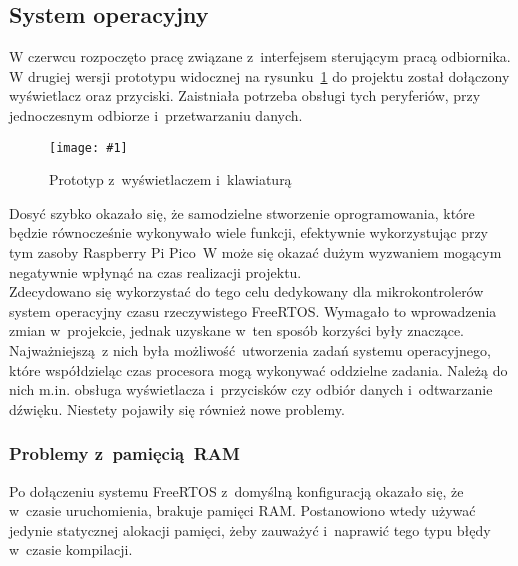 \documentclass[polish]{aghengthesis}
\newcommand{\imgint}[4]{
	\begin{figure}[{#4}]
		\centering
		\texttt{[image: \#1]}
		\caption{#2}
		\label{#1}
	\end{figure}
}
\newcommand{\imgh}[3]{\imgint{#1}{#2}{#3}{H}}
\begin{document}
			
		\subsection{System operacyjny}
			W czerwcu rozpoczęto pracę związane z~interfejsem sterującym pracą odbiornika.
			W drugiej wersji prototypu widocznej na rysunku~\ref{4/prototype_2} do projektu został dołączony wyświetlacz oraz przyciski. Zaistniała potrzeba obsługi tych peryferiów, przy jednoczesnym odbiorze i~przetwarzaniu danych.
			
			\imgh{4/prototype_2}{Prototyp z~wyświetlaczem i~klawiaturą}{0.8}
			
			Dosyć szybko okazało się, że samodzielne stworzenie oprogramowania, które będzie równocześnie wykonywało wiele funkcji, efektywnie wykorzystując przy tym zasoby Raspberry Pi Pico~W może się okazać dużym wyzwaniem mogącym negatywnie wpłynąć na czas realizacji projektu.
			$ $\\
			
			Zdecydowano się wykorzystać do tego celu dedykowany dla mikrokontrolerów system operacyjny czasu rzeczywistego FreeRTOS. Wymagało to wprowadzenia zmian w~projekcie, jednak uzyskane w~ten sposób korzyści były znaczące.
			Najważniejszą z nich była możliwość utworzenia zadań systemu operacyjnego, które współdzieląc czas procesora mogą wykonywać oddzielne zadania.
			Należą do nich m.in. obsługa wyświetlacza i~przycisków czy odbiór danych i~odtwarzanie dźwięku.
			Niestety pojawiły się również nowe problemy.
			
			\subsubsection{Problemy z~pamięcią RAM}
				Po dołączeniu systemu FreeRTOS z~domyślną konfiguracją okazało się, że w~czasie uruchomienia, brakuje pamięci RAM.
				Postanowiono wtedy używać jedynie statycznej alokacji pamięci, żeby zauważyć i~naprawić tego typu błędy w~czasie kompilacji.
				$ $\\
\end{document}
